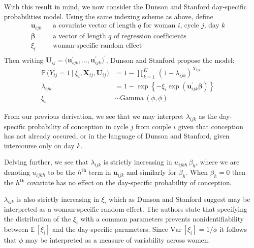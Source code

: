 \documentclass[11pt]{article}
\newcommand{\prob}{\mathbb{P}\,}
\newcommand{\ev}{\mathbb{E}\,}
\newcommand{\var}{\text{Var}\,}
\renewcommand{\vec}{\boldsymbol}
\begin{document}
With this result in mind, we now consider the Dunson and Stanford day-specific probabilities model.  Using the same indexing scheme as above, define
\[ \begin{array}{lll}
\vec{u}_{ijk} & & \text{a covariate vector of length $q$ for  woman $i$, cycle $j$, day $k$} \\[1ex]
\vec{\beta} & & \text{a vector of length $q$ of regression coefficients} \\[1ex]
\xi_i & & \text{woman-specific random effect} \\
\end{array} \]
Then writing $\vec{U}_{ij} = \big( \vec{u}_{ijk}^\prime, \dots, \vec{u}_{ijk}^\prime \big)^\prime$, Dunson and Stanford propose the model:
\begin{align} \label{eq: DSP model}
\prob\Big( Y_{ij} = 1 ~\big|~ \xi_i, \vec{X}_{ij}, \vec{U}_{ij} \Big) &= 1 - \prod_{k=1}^K\, (1 - \lambda_{ijk})^{X_{ijk}} \nonumber \\
\lambda_{ijk} &= 1 - \exp\left\{ -\xi_i \exp\left( \vec{u}_{ijk}^\prime \vec{\beta} \right) \right\} \nonumber \\[1ex]
\xi_i &\sim \text{Gamma}\,(\phi,\phi)
\end{align}

\noindent From our previous derivation, we see that we may interpret $\lambda_{ijk}$ as the day-specific probability of conception in cycle $j$ from couple $i$ given that conception has not already occured, or in the language of Dunson and Stanford, given intercourse only on day $k$.

Delving further, we see that $\lambda_{ijk}$ is strictly increasing in $u_{ijkh}\, \beta_{h}$, where we are denoting $u_{ijkh}$ to be the $h^{\text{th}}$ term in $\vec{u}_{ijk}$ and similarly for $\beta_h$.  When $\beta_h = 0$ then the $h^{\text{th}}$ covariate has no effect on the day-specific probability of conception.

$\lambda_{ijk}$ is also strictly increasing in $\xi_i$ which as Dunson and Stanford suggest may be interpreted as a woman-specific random effect.  The authors state that specifying the distribution of the $\xi_i$ with a common parameters prevents nonidentifiability between $\ev [\xi_i]$ and the day-specific parameters.  Since $\var[\xi_i] = 1 / \phi$ it follows that $\phi$ may be interpreted as a measure of variability across women. 




\end{document}
